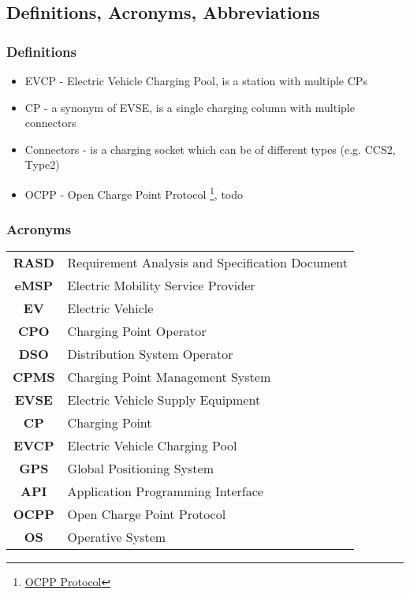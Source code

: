 \subsection{Definitions, Acronyms, Abbreviations}

\subsubsection{Definitions}
\begin{itemize}
    \item EVCP - Electric Vehicle Charging Pool, is a station with multiple CPs
    \item CP - a synonym of EVSE, is a single charging column with multiple connectors
    \item Connectors - is a charging socket which can be of different types (e.g. CCS2, Type2)
    \item OCPP - Open Charge Point Protocol \footnote{\href{https://www.openchargealliance.org/protocols/ocpp-201/}{OCPP Protocol}}, todo
\end{itemize}

\subsubsection{Acronyms}
\begin{table}[H]
    \begin{tabularx}{\textwidth}{cX}
        \toprule
        \textbf{RASD} & Requirement Analysis and Specification Document \\
        \textbf{eMSP} & Electric Mobility Service Provider              \\
        \textbf{EV}   & Electric Vehicle                                \\
        \textbf{CPO}  & Charging Point Operator                         \\
        \textbf{DSO}  & Distribution System Operator                    \\
        \textbf{CPMS} & Charging Point Management System                \\
        \textbf{EVSE} & Electric Vehicle Supply Equipment               \\
        \textbf{CP}   & Charging Point                                  \\
        \textbf{EVCP} & Electric Vehicle Charging Pool                  \\
        \textbf{GPS}  & Global Positioning System                       \\
        \textbf{API}  & Application Programming Interface               \\
        \textbf{OCPP} & Open Charge Point Protocol                      \\
        \textbf{OS}   & Operative System                                \\
        \bottomrule
    \end{tabularx}
\end{table}

